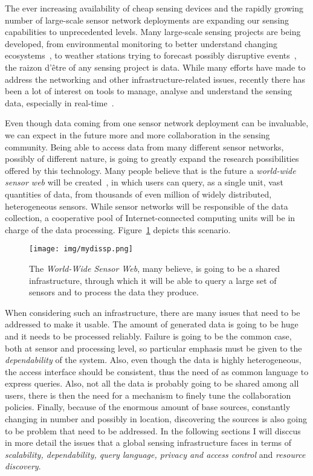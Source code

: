 The ever increasing availability of cheap sensing devices and the rapidly growing number of large-scale sensor
network deployments are expanding our sensing capabilities to unprecedented levels. Many large-scale sensing projects
are being developed, from environmental monitoring to better understand changing ecosystems~\cite{neon, earthscope,
swissexp}, to weather stations trying to forecast possibly disruptive events~\cite{casa, lead}, the raizon d'\^etre of any sensing project is data. While many efforts have made to
address the networking and other infrastructure-related issues, recently there has been a lot of interest on tools to
manage, analyse and understand the sensing data, especially in real-time~\cite{stream-processing-challanges}. 

Even though data coming from one sensor network deployment can be invaluable, we can expect in the future more and more
collaboration in the sensing community. Being able to access data from many different sensor networks, possibly of
different nature, is going to greatly expand the research possibilities offered by this technology. Many people believe
that is the future a \textit{world-wide sensor web} will be created~\cite{irisnet, senseweb}, in which users can query, as a single unit, vast quantities of data, from thousands of
even million of widely distributed, heterogeneous sensors. While sensor networks will be responsible of the data
collection, a cooperative pool of Internet-connected computing units will be in charge of the data processing. 
Figure~\ref{fig:wwsw} depicts this scenario.

\begin{figure}[b!]
	\centering
	\texttt{[image: img/mydissp.png]}
	\caption{The \emph{World-Wide Sensor Web}, many believe, is going to be a shared infrastructure, through which it will be able to
query a large set of sensors and to process the data they produce.}
	\label{fig:wwsw}
\end{figure}

When considering such an infrastructure, there are many issues that need to be addressed to make it usable. The amount
of generated data is going to be huge and it needs to be processed reliably. Failure is going to be the common case,
both at sensor and processing level, so particular emphasis must be given to the \emph{dependability} of the system. Also, even
though the data is highly heterogeneous, the access interface should be consistent, thus the need of as common language
to express queries. Also, not all the data is probably going to be shared among all users, there is then the need for a mechanism to
finely tune the collaboration policies. Finally, because of the enormous amount of base sources, constantly changing in
number and possibly in location, discovering the sources is also going to be problem that need to be addressed.
In the following sections I will disccus in more detail the issues that a global sensing infrastructure faces in terms
of \emph{scalability, dependability, query language, privacy and access control} and \emph{resource discovery}.

